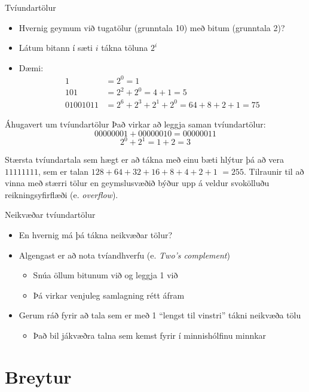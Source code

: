 \documentclass[handout]{beamer}
\begin{document}
\begin{frame}{Tvíundartölur}
\begin{itemize}
 \item Hvernig geymum við tugatölur (grunntala 10) með bitum (grunntala 2)? \pause
 \item Látum bitann í sæti $i$ tákna töluna $2^i$
 \item Dæmi:
\begin{align*}
1 		&=  2^0  	= 1\\
101		&=  2^2 + 2^0  =  4 + 1  =  5\\
01001011	&=  2^6 + 2^3 + 2^1 + 2^0  =  64 + 8 + 2 + 1 = 75
\end{align*}
\end{itemize}
\end{frame}

\begin{frame}{Áhugavert um tvíundartölur}
Það virkar að leggja saman tvíundartölur: 
\[
  00000001 + 00000010 = 00000011
\]
\[
 2^0 + 2^1 = 1 + 2 = 3
\]

Stærsta tvíundartala sem hægt er að tákna með einu bæti hlýtur þá að vera $11111111$, sem er talan $128+64+32+16+8+4+2+1$  $=  255$. Tilraunir til að vinna með stærri tölur en geymslusvæðið býður upp á veldur svokölluðu reikningsyfirflæði (e. \emph{overflow}).
\end{frame}

\begin{frame}{Neikvæðar tvíundartölur}
\begin{itemize}
 \item En hvernig má þá tákna neikvæðar tölur? \pause
 \item Algengast er að nota tvíandhverfu (e. \emph{Two's complement})
 \begin{itemize}
  \item Snúa öllum bitunum við og leggja 1 við
  \item Þá virkar venjuleg samlagning rétt áfram
 \end{itemize}
 \item Gerum ráð fyrir að tala sem er með 1 ``lengst til vinstri'' tákni neikvæða tölu
 \begin{itemize}
  \item Það bil jákvæðra talna sem kemst fyrir í minnishólfinu minnkar
 \end{itemize}
\end{itemize}
\end{frame}

\section{Breytur}
\end{document}
